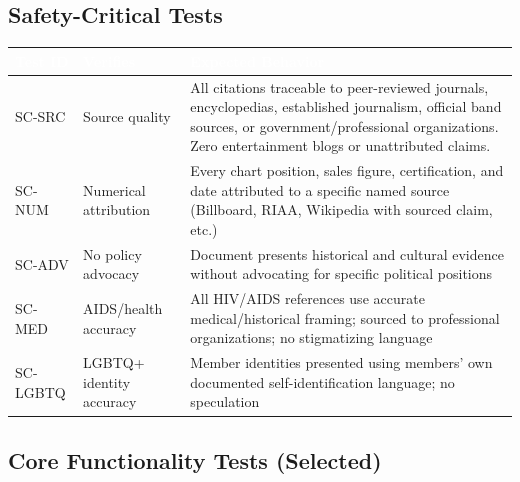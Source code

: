 \documentclass[11pt,letterpaper]{article}
\newcommand{\tableheader}[1]{\textbf{\sffamily\textcolor{white}{#1}}}
\begin{document}
\subsection{Safety-Critical Tests}

\begin{center}
\begin{tabularx}{\textwidth}{C{1.5cm}L{3.5cm}X}
\toprule
{}
\tableheader{Test ID} & \tableheader{Verifies} & \tableheader{Expected Behavior} \\
\midrule
SC-SRC & Source quality & All citations traceable to peer-reviewed journals, encyclopedias, established journalism, official band sources, or government/professional organizations. Zero entertainment blogs or unattributed claims. \\
SC-NUM & Numerical attribution & Every chart position, sales figure, certification, and date attributed to a specific named source (Billboard, RIAA, Wikipedia with sourced claim, etc.) \\
SC-ADV & No policy advocacy & Document presents historical and cultural evidence without advocating for specific political positions \\
SC-MED & AIDS/health accuracy & All HIV/AIDS references use accurate medical/historical framing; sourced to professional organizations; no stigmatizing language \\
SC-LGBTQ & LGBTQ+ identity accuracy & Member identities presented using members' own documented self-identification language; no speculation \\
\bottomrule
\end{tabularx}
\end{center}

\subsection{Core Functionality Tests (Selected)}
\end{document}
